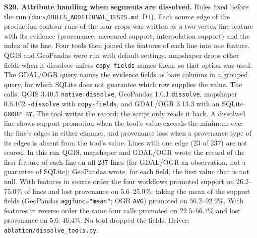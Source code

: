 \documentclass[11pt]{article}
\begin{document}
\vspace{4mm}
\noindent\textbf{S20. Attribute handling when segments are dissolved.} Rules fixed before the run (\texttt{docs/\allowbreak RULES\_\allowbreak ADDITIONAL\_\allowbreak TESTS.md}, D1). Each source edge of the production contour runs of the four crops was written as a two-vertex line feature with its evidence (provenance, measured support, interpolation support) and the index of its line. Four tools then joined the features of each line into one feature. QGIS and GeoPandas were run with default settings. mapshaper drops other fields when it dissolves unless \texttt{copy-fields} names them, so that option was used. The GDAL/OGR query names the evidence fields as bare columns in a grouped query, for which SQLite does not guarantee which row supplies the value. The calls: QGIS 3.40.5 \texttt{native:dissolve}, GeoPandas 1.0.1 \texttt{dissolve}, mapshaper 0.6.102 \texttt{-dissolve} with \texttt{copy-fields}, and GDAL/OGR 3.13.3 with an SQLite \texttt{GROUP BY}. The tool writes the record; the script only reads it back. A dissolved line shows support promotion when the tool's value exceeds the minimum over the line's edges in either channel, and provenance loss when a provenance type of its edges is absent from the tool's value. Lines with one edge (23 of 237) are not scored. In this run QGIS, mapshaper and GDAL/OGR wrote the record of the first feature of each line on all 237 lines (for GDAL/OGR an observation, not a guarantee of SQLite); GeoPandas wrote, for each field, the first value that is not null. With features in source order the four workflows promoted support on 26.2--75.0\% of lines and lost provenance on 5.6--25.0\%; taking the mean of the support fields (GeoPandas \texttt{aggfunc="mean"}; OGR \texttt{AVG}) promoted on 56.2--92.9\%. With features in reverse order the same four calls promoted on 22.5--66.7\% and lost provenance on 5.6--46.4\%. No tool dropped the fields. Driver: \texttt{ablation/dissolve\_tools.py}.
\end{document}
